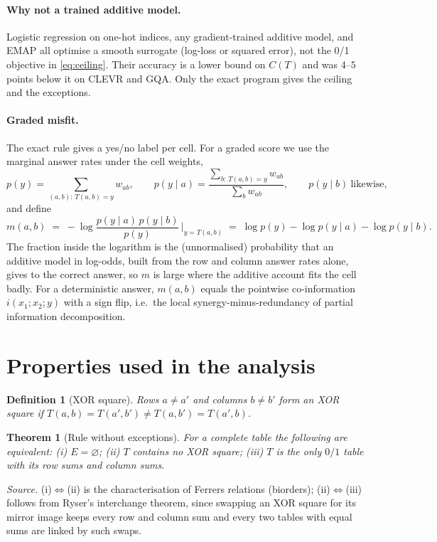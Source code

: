 \documentclass[11pt]{article}
\newtheorem{definition}{Definition}
\newtheorem{theorem}{Theorem}
\newcommand{\1}{\mathbf{1}}
\begin{document}
\paragraph{Why not a trained additive model.} Logistic regression on one-hot indices, any gradient-trained additive
model, and EMAP all optimise a smooth surrogate (log-loss or squared error), not the 0/1 objective in
\eqref{eq:ceiling}. Their accuracy is a lower bound on $C(T)$ and was $4$--$5$ points below it on CLEVR and GQA. Only
the exact program gives the ceiling and the exceptions.

\paragraph{Graded misfit.} The exact rule gives a yes/no label per cell. For a graded score we use the marginal answer
rates under the cell weights,
\[
  p(y)=\sum_{(a,b):\,T(a,b)=y}w_{ab},\qquad p(y\mid a)=\frac{\sum_{b:\,T(a,b)=y}w_{ab}}{\sum_{b}w_{ab}},\qquad p(y\mid b)\ \text{likewise},
\]
and define
\begin{equation}\label{eq:misfit}
  m(a,b)\;=\;-\log\frac{p(y\mid a)\,p(y\mid b)}{p(y)}\,\Big|_{y=T(a,b)}
  \;=\;\log p(y)-\log p(y\mid a)-\log p(y\mid b).
\end{equation}
The fraction inside the logarithm is the (unnormalised) probability that an additive model in log-odds, built from the
row and column answer rates alone, gives to the correct answer, so $m$ is large where the additive account fits the cell
badly. For a deterministic answer, $m(a,b)$ equals the pointwise co-information
$i(x_1;x_2;y)$ with a sign flip, i.e.\ the local synergy-minus-redundancy of partial information decomposition.

\section{Properties used in the analysis}\label{sec:theory}

\begin{definition}[XOR square]
Rows $a\neq a'$ and columns $b\neq b'$ form an \emph{XOR square} if $T(a,b)=T(a',b')\neq T(a,b')=T(a',b)$.
\end{definition}

\begin{theorem}[Rule without exceptions]\label{thm:ferrers}
For a complete table the following are equivalent: (i) $E=\varnothing$; (ii) $T$ contains no XOR square;
(iii) $T$ is the only $0/1$ table with its row sums and column sums.
\end{theorem}
\noindent\emph{Source.} (i)$\Leftrightarrow$(ii) is the characterisation of Ferrers relations (biorders);
(ii)$\Leftrightarrow$(iii) follows from Ryser's interchange theorem, since swapping an XOR square for its mirror image
keeps every row and column sum and every two tables with equal sums are linked by such swaps.
\end{document}
